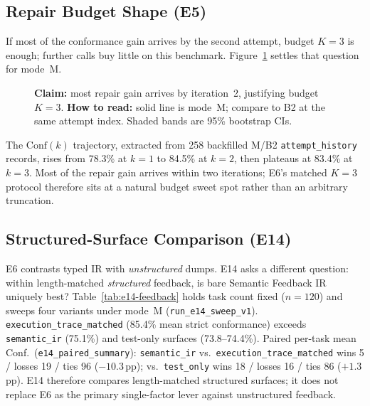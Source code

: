\begin{table}[H]
  \caption{E6 on second endpoint \texttt{ecnu-max} ($n{=}120$ per variant).}
  \label{tab:feedback-e6-max}
  \centering
\end{table}

\subsection{Repair Budget Shape (E5)}

If most of the conformance gain arrives by the second attempt, budget $K{=}3$
is enough; further calls buy little on this benchmark.
Figure~\ref{fig:convergence} settles that question for mode~M.

\begin{figure}[t]
  \centering
  \caption{\textbf{Claim:} most repair gain arrives by iteration~2, justifying
    budget $K=3$.
    \textbf{How to read:} solid line is mode~M; compare to B2 at the same
    attempt index.  Shaded bands are 95\% bootstrap CIs.}
  \label{fig:convergence}
\end{figure}

The $\mathrm{Conf}(k)$ trajectory, extracted from 258 backfilled M/B2
\texttt{attempt\_history} records, rises from 78.3\% at $k{=}1$ to 84.5\% at
$k{=}2$, then plateaus at 83.4\% at $k{=}3$.
Most of the repair gain arrives within two iterations; E6's matched $K{=}3$
protocol therefore sits at a natural budget sweet spot rather than an
arbitrary truncation.

\subsection{Structured-Surface Comparison (E14)}
\label{sec:results:e14}

E6 contrasts typed IR with \emph{unstructured} dumps.
E14 asks a different question: within length-matched \emph{structured}
feedback, is bare Semantic Feedback IR uniquely best?
Table~\ref{tab:e14-feedback} holds task count fixed ($n{=}120$) and sweeps
four variants under mode~M (\texttt{run\_e14\_sweep\_v1}).
\texttt{execution\_trace\_matched} (85.4\% mean strict conformance) exceeds
\texttt{semantic\_ir} (75.1\%) and test-only surfaces (73.8--74.4\%).
Paired per-task mean Conf.\ (\texttt{e14\_paired\_summary}):
\texttt{semantic\_ir} vs.\ \texttt{execution\_trace\_matched} wins 5 / losses
19 / ties 96 (${-}10.3$\,pp); vs.\ \texttt{test\_only} wins 18 / losses 16 /
ties 86 (${+}1.3$\,pp).
E14 therefore compares length-matched structured surfaces; it does not
replace E6 as the primary single-factor lever against unstructured feedback.

